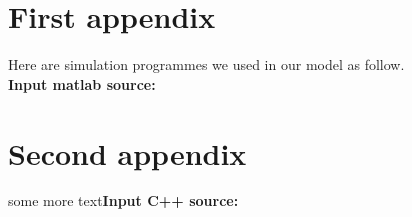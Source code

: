 







\begin{thebibliography}{99}
\end{thebibliography}
\begin{appendices}
\section{First appendix}
Here are simulation programmes we used in our model as follow.\\
\textbf{\textcolor[rgb]{0.98,0.00,0.00}{Input matlab source:}}

\section{Second appendix}
some more text\textcolor[rgb]{0.98,0.00,0.00}{\textbf{Input C++ source:}}

\end{appendices}
